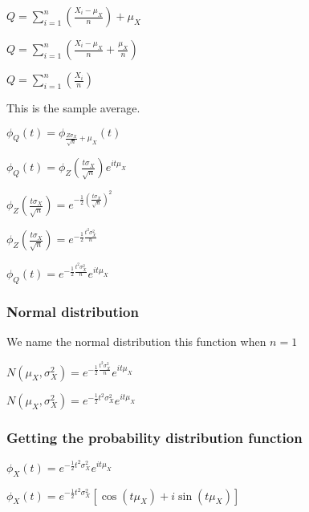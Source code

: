 \(Q=\sum_{i=1}^n(\frac{X_i-\mu_X }{n})+\mu_X\)

\(Q=\sum_{i=1}^n(\frac{X_i-\mu_X }{n}+\frac{\mu_X}{n})\)

\(Q=\sum_{i=1}^n(\frac{X_i}{n})\)

This is the sample average.

\(\phi_Q(t)=\phi_{\frac{Z\sigma_X }{\sqrt n}+\mu_X}(t)\)

\(\phi_Q(t)=\phi_Z(\frac{t\sigma_X }{\sqrt n})e^{it\mu_X}\)

\(\phi_Z(\frac{t\sigma_X }{\sqrt n})=e^{-\frac{1}{2}(\frac{t\sigma_X }{\sqrt n})^2}\)

\(\phi_Z(\frac{t\sigma_X }{\sqrt n})=e^{-\frac{1}{2}\frac{t^2\sigma^2_X }{n}}\)

\(\phi_Q(t)=e^{-\frac{1}{2}\frac{t^2\sigma^2_X }{n}}e^{it\mu_X}\)

\subsubsection{Normal distribution}

We name the normal distribution this function when \(n=1\)

\(N(\mu_X, \sigma^2_X)=e^{-\frac{1}{2}\frac{t^2\sigma^2_X }{n}}e^{it\mu_X}\)

\(N(\mu_X, \sigma^2_X)=e^{-\frac{1}{2}t^2\sigma^2_X }e^{it\mu_X}\)

\subsubsection{Getting the probability distribution function}

\(\phi_X(t)=e^{-\frac{1}{2}t^2\sigma^2_X} e^{it\mu_X}\)

\(\phi_X(t)=e^{-\frac{1}{2}t^2\sigma^2_X}[\cos (t\mu_X )+i\sin (t\mu_X)]\)

